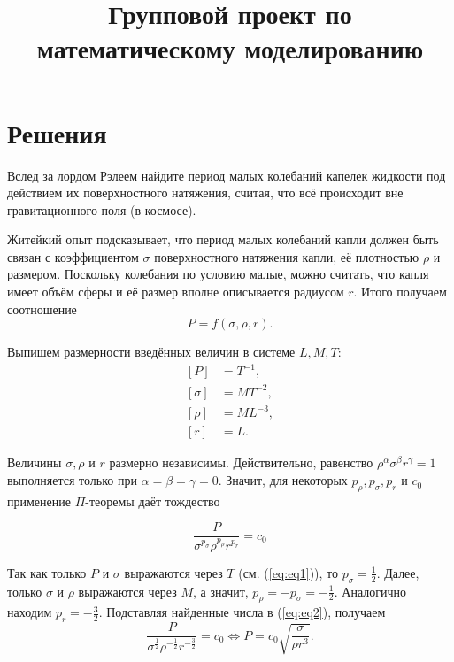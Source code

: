 


\title{Групповой проект по математическому моделированию}
\date{}


\maketitle

\tableofcontents

\section{Решения}

 Вслед за лордом Рэлеем найдите период малых колебаний капелек жидкости под действием их поверхностного натяжения, считая, что всё происходит вне гравитационного поля (в космосе).\par

Житейкий опыт подсказывает, что период малых колебаний капли должен быть связан с коэффициентом $\sigma$ поверхностного натяжения капли, её плотностью $\rho$ и размером. Поскольку колебания по условию малые, можно считать, что капля имеет объём сферы и её размер вполне описывается радиусом $r$. Итого получаем соотношение
\[ P = f(\sigma, \rho, r). \]

Выпишем размерности введённых величин в системе $L, M, T$:
\begin{equation} \label{eq:eq1}
\begin{split}
[P] & = T^{-1},\\
[\sigma] & = MT^{-2},\\
[\rho] & = ML^{-3},\\
[r] & = L.
\end{split}
\end{equation}

Величины $\sigma, \rho$ и $r$ размерно независимы. Действительно, равенство $\rho ^\alpha \sigma ^\beta r^\gamma =1$ выполняется только при $\alpha = \beta = \gamma = 0$. Значит, для некоторых $p_\rho, p_\sigma, p_r$ и $c_0$ применение $\Pi$-теоремы даёт тождество

\begin{equation} \label{eq:eq2}
\dfrac{P}{\sigma ^{p_\sigma} \rho ^{p_\rho} r^{p_r}} = c_0 
\end{equation}

Так как только $P$ и $\sigma$ выражаются через $T$ (см. (\ref{eq:eq1})), то $p_\sigma = \frac{1}{2}$. Далее, только $\sigma$ и $\rho$ выражаются через 
$M$, а значит, $p_\rho = -p_\sigma = -\frac{1}{2}$. Аналогично находим $p_r = -\frac{3}{2}$. Подставляя найденные числа в (\ref{eq:eq2}), получаем
\[
\dfrac{P}{\sigma ^{\frac{1}{2}} \rho ^{-\frac{1}{2}} r^{-\frac{3}{2}}} = c_0 \iff 
P = c_0 \sqrt{ \dfrac{\sigma}{\rho r^3} }.
\]

